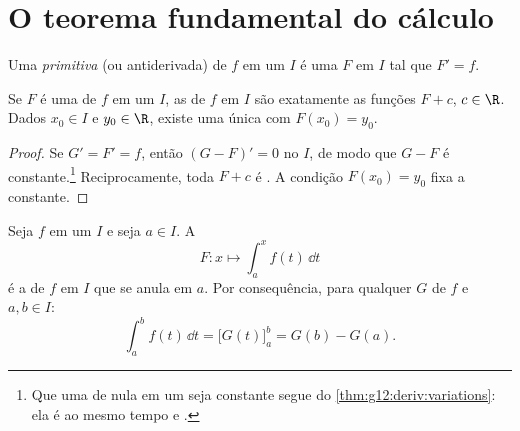 \section{O teorema fundamental do cálculo}

\begin{definition}[Primitiva]\label{def:g12:integ:primitive}
Uma \emph{primitiva} (ou antiderivada) de $f$ em um
 $I$ é uma   $F$ em $I$ tal que $F' = f$.
\end{definition}

\begin{proposition}\label{prop:g12:integ:primunique}
Se $F$ é uma  de $f$ em um  $I$, as  de $f$ em
$I$ são exatamente as funções $F + c$, $c \in \R$. Dados $x_0 \in I$ e
$y_0 \in \R$, existe uma única  com $F(x_0) = y_0$.
\end{proposition}

\begin{proof}
Se $G' = F' = f$, então $(G - F)' = 0$ no  $I$, de modo que
$G - F$ é constante.\footnote{Que uma  de  nula em um
 seja constante segue do \cref{thm:g12:deriv:variations}: ela é ao
mesmo tempo  e .} Reciprocamente, toda $F + c$ é
. A condição $F(x_0) = y_0$ fixa a constante.
\end{proof}

\begin{theorem}\label{thm:g12:integ:ftc}
Seja $f$  em um  $I$ e seja $a \in I$. A 
\[
F \colon x \longmapsto \int_a^x f(t)\,\dd t
\]
é a  de $f$ em $I$ que se anula em $a$. Por consequência, para
qualquer  $G$ de $f$ e $a, b \in I$:
\[
\int_a^b f(t)\,\dd t = \bigl[G(t)\bigr]_a^b = G(b) - G(a).
\]
\end{theorem}

